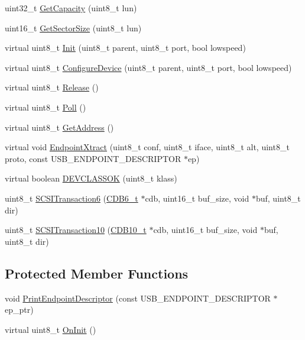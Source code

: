 \begin{DoxyCompactItemize}
\item 
uint32\-\_\-t \hyperlink{class_bulk_only_a597193e88b168e96878d383619f1377d}{\-Get\-Capacity} (uint8\-\_\-t lun)
\item 
uint16\-\_\-t \hyperlink{class_bulk_only_ac97cfb7558681af4cfaa11fcccc00170}{\-Get\-Sector\-Size} (uint8\-\_\-t lun)
\item 
virtual uint8\-\_\-t \hyperlink{class_bulk_only_a51870da9badc037166b86da60bcda6ea}{\-Init} (uint8\-\_\-t parent, uint8\-\_\-t port, bool lowspeed)
\item 
virtual uint8\-\_\-t \hyperlink{class_bulk_only_aa8fe167a7af12dce9964fa5a430c53ea}{\-Configure\-Device} (uint8\-\_\-t parent, uint8\-\_\-t port, bool lowspeed)
\item 
virtual uint8\-\_\-t \hyperlink{class_bulk_only_a8a9b213d1800db2d8e661d242b57b195}{\-Release} ()
\item 
virtual uint8\-\_\-t \hyperlink{class_bulk_only_a51b8a76f5e16697476ce2dcff2514bc6}{\-Poll} ()
\item 
virtual uint8\-\_\-t \hyperlink{class_bulk_only_a376cb3367071555816e2b0c74ad7eb12}{\-Get\-Address} ()
\item 
virtual void \hyperlink{class_bulk_only_a13d33906543d5d6b44620f430dc729ff}{\-Endpoint\-Xtract} (uint8\-\_\-t conf, uint8\-\_\-t iface, uint8\-\_\-t alt, uint8\-\_\-t proto, const \-U\-S\-B\-\_\-\-E\-N\-D\-P\-O\-I\-N\-T\-\_\-\-D\-E\-S\-C\-R\-I\-P\-T\-O\-R $\ast$ep)
\item 
virtual boolean \hyperlink{class_bulk_only_a509fdebcff72a9c0c8db706416f5bf23}{\-D\-E\-V\-C\-L\-A\-S\-S\-O\-K} (uint8\-\_\-t klass)
\item 
uint8\-\_\-t \hyperlink{class_bulk_only_abec80bf6c8306115de66c0f87389bbd3}{\-S\-C\-S\-I\-Transaction6} (\hyperlink{masstorage_8h_a56ab0baf4e98a591274bf8d1acf96d85}{\-C\-D\-B6\-\_\-t} $\ast$cdb, uint16\-\_\-t buf\-\_\-size, void $\ast$buf, uint8\-\_\-t dir)
\item 
uint8\-\_\-t \hyperlink{class_bulk_only_af07ab48c6b9e6bdb4f0d050adbae518d}{\-S\-C\-S\-I\-Transaction10} (\hyperlink{masstorage_8h_af952fd9270407996656ba95772511002}{\-C\-D\-B10\-\_\-t} $\ast$cdb, uint16\-\_\-t buf\-\_\-size, void $\ast$buf, uint8\-\_\-t dir)
\end{DoxyCompactItemize}
\subsection*{\-Protected \-Member \-Functions}
\begin{DoxyCompactItemize}
\item 
void \hyperlink{class_bulk_only_ac8a1d7b2ef82d9f6da44928c78039964}{\-Print\-Endpoint\-Descriptor} (const \-U\-S\-B\-\_\-\-E\-N\-D\-P\-O\-I\-N\-T\-\_\-\-D\-E\-S\-C\-R\-I\-P\-T\-O\-R $\ast$ep\-\_\-ptr)
\item 
virtual uint8\-\_\-t \hyperlink{class_bulk_only_a3d253a0bc8f1ac5b7fe1c9e7078691e3}{\-On\-Init} ()
\end{DoxyCompactItemize}
